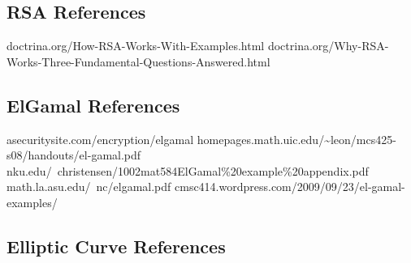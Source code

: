 \documentclass[conference]{IEEEtran}
\begin{document}
\subsection{RSA References}
doctrina.org/How-RSA-Works-With-Examples.html \newline
doctrina.org/Why-RSA-Works-Three-Fundamental-Questions-Answered.html \newline


\subsection{ElGamal References}
asecuritysite.com/encryption/elgamal \newline
homepages.math.uic.edu/\textasciitilde leon/mcs425-s08/handouts/el-gamal.pdf \newline
nku.edu/~christensen/1002mat584ElGamal\%20example\%20appendix.pdf \newline
math.la.asu.edu/~nc/elgamal.pdf \newline
cmsc414.wordpress.com/2009/09/23/el-gamal-examples/ \newline


\color{red}
\subsection{Elliptic Curve References}
\end{document}
